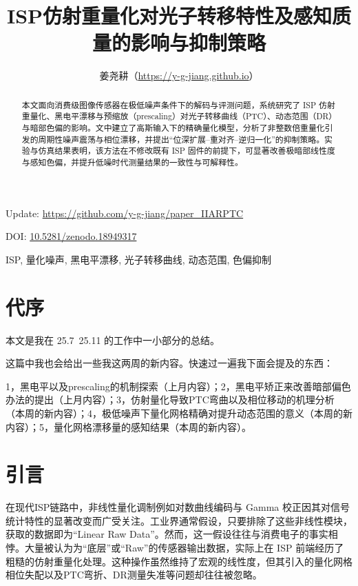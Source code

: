 \documentclass[journal]{IEEEtran}
\title{ISP仿射重量化对光子转移特性及感知质量的影响与抑制策略}
\author{姜尧耕（\url{https://y-g-jiang.github.io}）}
\begin{document}
\maketitle
\pagestyle{aphi}
\thispagestyle{aphi}
\begin{center}
Update: \url{https://github.com/y-g-jiang/paper_IIARPTC}

DOI: \href{https://doi.org/10.5281/zenodo.18949317}{10.5281/zenodo.18949317}
\end{center}

\begin{abstract}
本文面向消费级图像传感器在极低噪声条件下的解码与评测问题，系统研究了 ISP 仿射重量化、黑电平漂移与预缩放（prescaling）对光子转移曲线（PTC）、动态范围（DR）与暗部色偏的影响。文中建立了高斯输入下的精确量化模型，分析了非整数倍重量化引发的周期性噪声震荡与相位漂移，并提出“位深扩展--重对齐--逆归一化”的抑制策略。实验与仿真结果表明，该方法在不修改既有 ISP 固件的前提下，可显著改善极暗部线性度与感知色偏，并提升低噪时代测量结果的一致性与可解释性。
\end{abstract}

\begin{IEEEkeywords}
ISP, 量化噪声, 黑电平漂移, 光子转移曲线, 动态范围, 色偏抑制
\end{IEEEkeywords}


\section{代序}


本文是我在 25.7~25.11 的工作中一小部分的总结。

这篇中我也会给出一些我这两周的新内容。快速过一遍我下面会提及的东西：

1，黑电平以及prescaling的机制探索（上月内容）；2，黑电平矫正来改善暗部偏色办法的提出（上月内容）；3，仿射量化导致PTC弯曲以及相位移动的机理分析（本周的新内容）；4，极低噪声下量化网格精确对提升动态范围的意义（本周的新内容）；5，量化网格漂移量的感知结果（本周的新内容）。

\section{引言}


在现代ISP链路中，非线性量化调制例如对数曲线编码与 Gamma 校正因其对信号统计特性的显著改变而广受关注。工业界通常假设，只要排除了这些非线性模块，获取的数据即为“Linear Raw Data”。然而，这一假设往往与消费电子的事实相悖。大量被认为为“底层”或“Raw”的传感器输出数据，实际上在 ISP 前端经历了粗糙的仿射重量化处理。这种操作虽然维持了宏观的线性度，但其引入的量化网格相位失配以及PTC弯折、DR测量失准等问题却往往被忽略。
\end{document}
